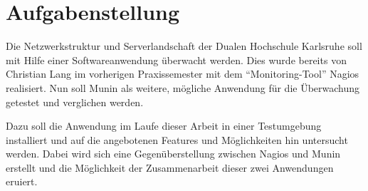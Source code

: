 \section{Aufgabenstellung}

Die Netzwerkstruktur und Serverlandschaft der Dualen Hochschule Karlsruhe soll mit Hilfe einer Softwareanwendung überwacht werden.
Dies wurde bereits von Christian Lang im vorherigen Praxissemester mit dem "`Monitoring-Tool"' Nagios realisiert.
Nun soll Munin als weitere, mögliche Anwendung für die Überwachung getestet und verglichen werden.

Dazu soll die Anwendung im Laufe dieser Arbeit in einer Testumgebung installiert und auf die angebotenen Features und Möglichkeiten hin untersucht werden.
Dabei wird sich eine Gegenüberstellung zwischen Nagios und Munin erstellt und die Möglichkeit der Zusammenarbeit dieser zwei Anwendungen eruiert.